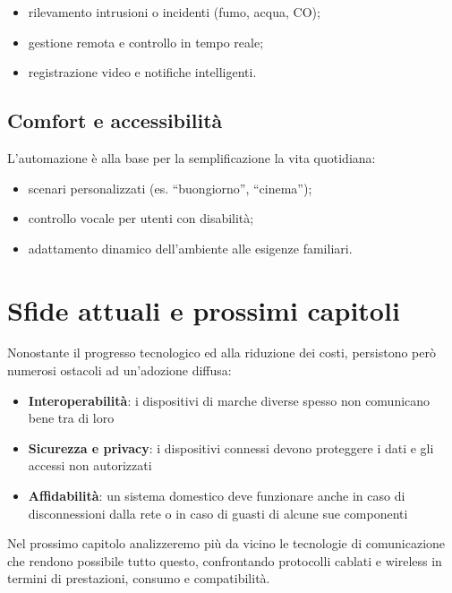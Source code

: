 \begin{itemize}
    \item rilevamento intrusioni o incidenti (fumo, acqua, CO);
    \item gestione remota e controllo in tempo reale;
    \item registrazione video e notifiche intelligenti.
\end{itemize}

\subsection{Comfort e accessibilità}

L'automazione è alla base per la semplificazione la vita quotidiana:

\begin{itemize}
    \item scenari personalizzati (es. “buongiorno”, “cinema”);
    \item controllo vocale per utenti con disabilità;
    \item adattamento dinamico dell’ambiente alle esigenze familiari.
\end{itemize}

\section{Sfide attuali e prossimi capitoli}

Nonostante il progresso tecnologico ed alla riduzione dei costi, persistono però numerosi ostacoli ad un'adozione diffusa:

\begin{itemize}
    \item \textbf{Interoperabilità}: i dispositivi di marche diverse spesso non comunicano bene tra di loro
    \item \textbf{Sicurezza e privacy}: i dispositivi connessi devono proteggere i dati e gli accessi non autorizzati
    \item \textbf{Affidabilità}: un sistema domestico deve funzionare anche in caso di disconnessioni dalla rete o in caso di guasti di alcune sue componenti
\end{itemize}

Nel prossimo capitolo analizzeremo più da vicino le tecnologie di comunicazione che rendono possibile tutto questo, confrontando protocolli cablati e wireless in termini di prestazioni, consumo e compatibilità.

